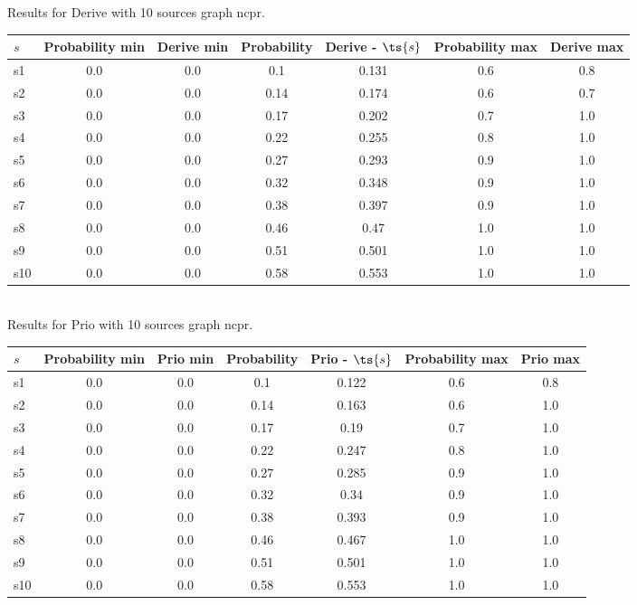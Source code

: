 \documentclass{article}
\begin{document}
\noindent Results for Derive with 10 sources graph ncpr.

\noindent\begin{tabular}{|l|c|c|c|c|c|c|}
\hline
$s$& Probability min & Derive min & Probability & Derive - $\ts{s}$ & Probability max & Derive max\\
\hline
s1 &0.0 & 0.0 & 0.1 & 0.131 & 0.6 & 0.8\\
\hline
s2 &0.0 & 0.0 & 0.14 & 0.174 & 0.6 & 0.7\\
\hline
s3 &0.0 & 0.0 & 0.17 & 0.202 & 0.7 & 1.0\\
\hline
s4 &0.0 & 0.0 & 0.22 & 0.255 & 0.8 & 1.0\\
\hline
s5 &0.0 & 0.0 & 0.27 & 0.293 & 0.9 & 1.0\\
\hline
s6 &0.0 & 0.0 & 0.32 & 0.348 & 0.9 & 1.0\\
\hline
s7 &0.0 & 0.0 & 0.38 & 0.397 & 0.9 & 1.0\\
\hline
s8 &0.0 & 0.0 & 0.46 & 0.47 & 1.0 & 1.0\\
\hline
s9 &0.0 & 0.0 & 0.51 & 0.501 & 1.0 & 1.0\\
\hline
s10 &0.0 & 0.0 & 0.58 & 0.553 & 1.0 & 1.0\\
\hline
\end{tabular}\\

\noindent Results for Prio with 10 sources graph ncpr.

\noindent\begin{tabular}{|l|c|c|c|c|c|c|}
\hline
$s$& Probability min & Prio min & Probability & Prio - $\ts{s}$ & Probability max & Prio max\\
\hline
s1 &0.0 & 0.0 & 0.1 & 0.122 & 0.6 & 0.8\\
\hline
s2 &0.0 & 0.0 & 0.14 & 0.163 & 0.6 & 1.0\\
\hline
s3 &0.0 & 0.0 & 0.17 & 0.19 & 0.7 & 1.0\\
\hline
s4 &0.0 & 0.0 & 0.22 & 0.247 & 0.8 & 1.0\\
\hline
s5 &0.0 & 0.0 & 0.27 & 0.285 & 0.9 & 1.0\\
\hline
s6 &0.0 & 0.0 & 0.32 & 0.34 & 0.9 & 1.0\\
\hline
s7 &0.0 & 0.0 & 0.38 & 0.393 & 0.9 & 1.0\\
\hline
s8 &0.0 & 0.0 & 0.46 & 0.467 & 1.0 & 1.0\\
\hline
s9 &0.0 & 0.0 & 0.51 & 0.501 & 1.0 & 1.0\\
\hline
s10 &0.0 & 0.0 & 0.58 & 0.553 & 1.0 & 1.0\\
\hline
\end{tabular}\\
\end{document}
